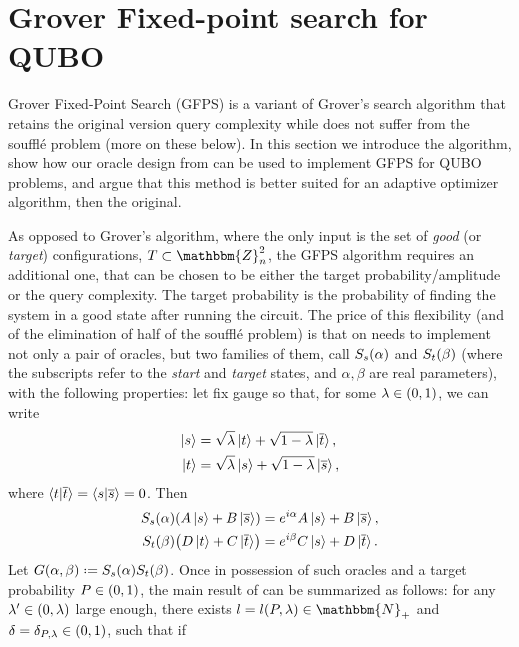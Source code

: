\documentclass[reqno,oneside,12pt]{amsart}  %
\numberwithin{equation}{section}                %
\let\originalleft\left
\let\originalright\right
\renewcommand{\left}{\mathopen{}\mathclose\bgroup\originalleft}
\renewcommand{\right}{\aftergroup\egroup\originalright}
\def\({\mathopen{}\left(}
\def\){\right)\mathclose{}}
\newcommand*{\eqdef}{\mathrel{\vcenter{\baselineskip0.5ex \lineskiplimit0pt\hbox{.}\hbox{.}}}=}
\def\N{\mathbbm{N}}
\def\Z{\mathbbm{Z}}
\begin{document}
\section{Grover Fixed-point search for QUBO}
\label{sec:grover_for_qubo}

Grover Fixed-Point Search (GFPS) \cite{yoder_fixed_2014} is a variant of Grover's search algorithm that retains the original version query complexity while does not suffer from the souffl\'e problem (more on these below). In this section we introduce the algorithm, show how our oracle design from  can be used to implement GFPS for QUBO problems, and argue that this method is better suited for an adaptive optimizer algorithm, then the original.

\smallskip

As opposed to Grover's algorithm, where the only input is the set of \emph{good} (or \emph{target}) configurations, $T \subset \Z_n^2$, the GFPS algorithm requires an additional one, that can be chosen to be either the target probability/amplitude or the query complexity. The target probability is the probability of finding the system in a good state after running the circuit. The price of this flexibility (and of the elimination of half of the souffl\'e problem) is that on needs to implement not only a pair of oracles, but two families of them, call $S_s \( \alpha \)$ and $S_t \( \beta \)$ (where the subscripts refer to the \emph{start} and \emph{target} states, and $\alpha, \beta$ are real parameters), with the following properties: let fix gauge so that, for some $\lambda \in \( 0, 1 \)$, we can write
\begin{align}
   \ket{s}  &= \sqrt{\lambda} \ket{t} + \sqrt{1 - \lambda} \ket{\overline{t}}, \\
   \ket{t}  &= \sqrt{\lambda} \ket{s} + \sqrt{1 - \lambda} \ket{\overline{s}},
\end{align}
where $\braket{t | \overline{t}} = \braket{s | \overline{s}} = 0$. Then
\begin{align}
   S_s \( \alpha \) \( A \ket{s} + B \ket{\overline{s}} \)  &= e^{i \alpha} A \ket{s} + B \ket{\overline{s}}, \\
   S_t \( \beta \) \( D \ket{t} + C \ket{\overline{t}} \)   &= e^{i \beta} C \ket{s} + D \ket{\overline{t}}.
\end{align}
Let $G \( \alpha, \beta \) \eqdef S_s \( \alpha \) S_t \( \beta \)$. Once in possession of such oracles and a target probability $P \in \( 0, 1 \)$, the main result of \cite{yoder_fixed_2014} can be summarized as follows: for any $\lambda^\prime \in \( 0, \lambda \)$ large enough, there exists $l = l \( P, \lambda \) \in \N_+$ and $\delta = \delta_{P, \lambda} \in \( 0, 1 \)$, such that if
\end{document}

